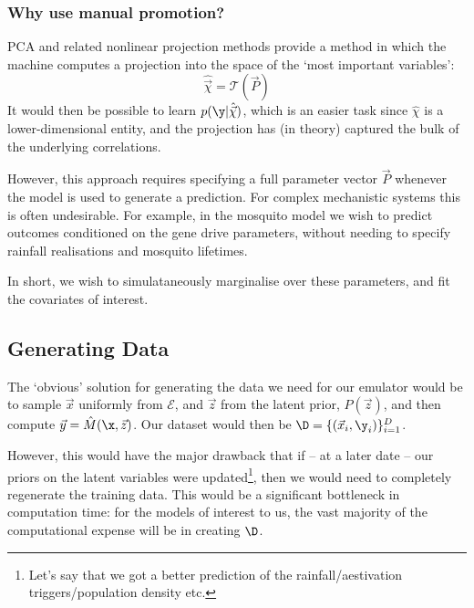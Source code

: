         \subsubsection*{Why use manual promotion?}
            
            PCA and related nonlinear projection methods provide a method in which the machine computes a projection into the space of the `most important variables':
            \begin{equation}
                \hat{\vec{\chi}} = \mathcal{T}(\vec{P})
            \end{equation}
            It would then be possible to learn $p(\y | \hat{\vec{\chi}})$, which is an easier task since $\hat{\chi}$ is a lower-dimensional entity, and the projection has (in theory) captured the bulk of the underlying correlations.

            However, this approach requires specifying a full parameter vector $\vec{P}$ whenever the model is used to generate a prediction. For complex mechanistic systems this is often undesirable. For example, in the mosquito model we wish to predict outcomes conditioned on the gene drive parameters, without needing to specify rainfall realisations and mosquito lifetimes.

            In short, we wish to simulataneously marginalise over these parameters, and fit the covariates of interest. 

\subsection{Generating Data}
        
    The `obvious' solution for generating the data we need for our emulator would be to sample $\vec{x}$ uniformly from $\mathcal{E}$, and $\vec{z}$ from the latent prior, $P(\vec{z})$, and then compute $\vec{y} = \hat{M}(\x, \vec{z})$. Our dataset would then be $\D =  \{(\vec{x}_i, \y_i)\}_{i=1}^{D}$.

    However, this would have the major drawback that if -- at a later date -- our priors on the latent variables were updated\footnote{Let's say that we got a better prediction of the rainfall/aestivation triggers/population density etc.}, then we would need to completely regenerate the training data. This would be a significant bottleneck in computation time: for the models of interest to us, the vast majority of the computational expense will be in creating $\D$.

